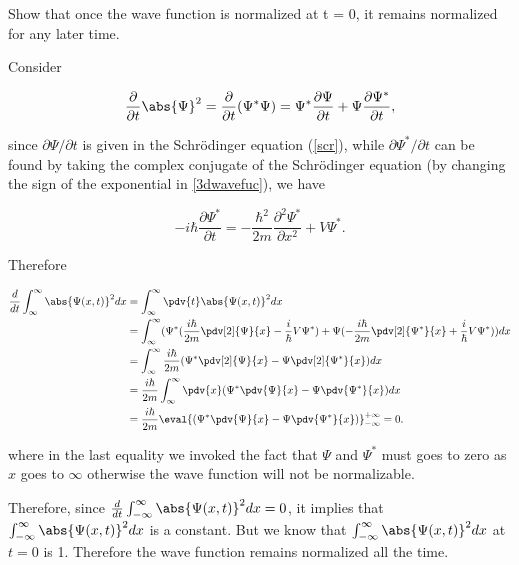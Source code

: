 \documentclass[a4paper,12pt]{report}
\begin{document}
{Show that once the wave function is normalized at t = 0, it remains normalized for any later time.}
{Consider

\begin{equation}
  \frac{\partial }{\partial t} \abs{\Psi }^2 = \frac{\partial }{\partial t} (\Psi^*\Psi ) = \Psi ^* \frac{\partial \Psi }{\partial t} + \Psi \frac{\partial \Psi ^*}{\partial t}, 
\end{equation}

since \(\partial \Psi / \partial t \) is given in the Schrödinger equation (\cref{scr}), while \(\partial \Psi ^* /\partial t\) can be found by taking the complex conjugate of the Schrödinger equation (by changing the sign of the exponential in \cref{3dwavefuc}), we have
		
\begin{equation}
  -i \hbar \frac{\partial \Psi^*}{\partial t}=-\frac{\hbar^2}{2 m} \frac{\partial^2 \Psi^*}{\partial x^2}+V\Psi^*.
\end{equation}
		
Therefore
		
\begin{equation}
  \begin{aligned}
    \frac{d}{dt}  \int_{\infty}^{\infty}   \abs{\Psi(x,t)}^2 dx  &= \int_{\infty}^{\infty}   \pdv{t} \abs{\Psi(x,t)}^2 dx \\ &= \int_{\infty}^{\infty}   (\Psi^*(\frac{i\hbar}{2m}\pdv[2]{\Psi}{x} - \frac{i}{\hbar}V\Psi^*) + \Psi(-\frac{i\hbar}{2m}\pdv[2]{\Psi^*}{x} + \frac{i}{\hbar}V\Psi^*))dx \\ &= \int_{\infty}^{\infty}   \frac{i\hbar}{2m}(\Psi^*\pdv[2]{\Psi}{x} - \Psi\pdv[2]{\Psi^*}{x})dx \\ &= \frac{i\hbar}{2m}\int_{\infty}^{\infty}  \pdv{x}(\Psi^*\pdv{\Psi}{x} - \Psi\pdv{\Psi^*}{x})dx \\ &= \frac{i\hbar}{2m} \eval{(\Psi^*\pdv{\Psi}{x} - \Psi\pdv{\Psi^*}{x})}_{-\infty}^{+\infty} = 0. \label{ddtpsi2}
  \end{aligned}
\end{equation}

where in the last equality we invoked the fact that \(\Psi\) and \(\Psi^*\) must goes to zero as \(x\) goes to \(\infty\) otherwise the wave function will not be normalizable.
		
Therefore, since \(\frac{d}{dt}  \int_{-\infty}^{\infty} \abs{\Psi (x,t)}^2 dx = 0\), it implies that \( \int_{-\infty}^{\infty}   \abs{\Psi(x,t)}^2 dx\) is a constant. But we know that \( \int_{-\infty}^{\infty}   \abs{\Psi(x,t)}^2 dx\) at \(t = 0\) is 1. Therefore the wave function remains normalized all the time.}		
		
\end{document}
